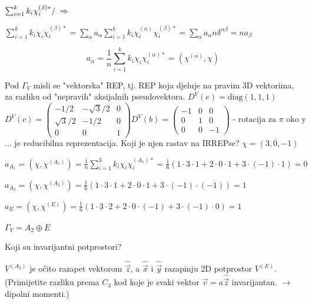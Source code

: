 $\sum_{i=1}^{k} k_i \chi^{(\beta)*}_i /  \;\Rightarrow\; $

$\sum_{i=1}^{k} k_i \chi_i \chi^{(\beta)*}_i =
\sum_{\alpha}  a_{\alpha} \sum_{i=1}^{k} k_i\chi^{(\alpha)}_i \chi^{(\beta)*}_i
=\sum_{\alpha}  a_{\alpha} n \delta^{\alpha \beta} = n a_{\beta} $


\begin{displaymath}
a_{\alpha} = \frac{1}{n} \sum_{i=1}^{k}  k_i \chi_i \chi^{(\alpha)*}_i
= (\chi^{(\alpha)}, \chi)
\end{displaymath}

\begin{primjer}
Pod $\Gamma_V$ misli se "vektorska" REP, tj. REP koja djeluje
na pravim 3D vektorima, za razliku od "nepravih" aksijalnih pseudovektora.
$D^{V}(e)=\textrm{diag}(1,1,1)$
\begin{displaymath}
D^{V}(c)=\left(
\begin{array}{ccc}
-1/2 & -\sqrt{3}/2 & 0 \\
\sqrt{3}/2 & -1/2 & 0 \\
0 & 0 & 1
\end{array}\right)
D^{V}(b)=\left(
\begin{array}{ccc}
-1 & 0 & 0 \\
0 & 1 & 0 \\
0 & 0 & -1
\end{array}\right) \textrm{ - rotacija za $\pi$ oko y}
\end{displaymath}
... je reducibilna reprezentacija. Koji je njen rastav na IRREPse?
$\chi=(3,0,-1)$

$a_{A_1} = (\chi, \chi^{(A_1)})=\frac{1}{n}\sum_{i=1}^{3} k_i \chi_i \chi^{(A_1)*}_i
 = \frac{1}{6}(1\cdot 3\cdot 1 + 2\cdot 0\cdot 1 + 3\cdot (-1) \cdot 1)=0$

$a_{A_2} = (\chi, \chi^{(A_2)})
=\frac{1}{6}(1\cdot 3\cdot 1 + 2\cdot 0\cdot 1 + 3\cdot (-1)\cdot(-1))=1$

$a_{E} = (\chi, \chi^{(E)})
=\frac{1}{6}(1\cdot 3\cdot 2 + 2\cdot 0\cdot (-1) + 3\cdot (-1)\cdot 0)=1$

$\Gamma_V  = A_2 \oplus E $

Koji su invarijantni potprostori?

$V^{(A_2)}$ je očito razapet vektorom $\hat{\vec{z}}$, a $\hat{\vec{x}}$ i
$\hat{\vec{y}}$ razapinju 2D potprostor $V^{(E)}$. (Primijetite razliku
prema $C_3$ kod koje je svaki vektor $\vec{v}=a\hat{\vec{z}}$ invarijantan.
$\to$ dipolni momenti.)
\end{primjer}


